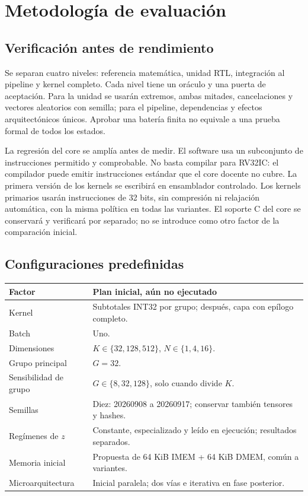 \section{Metodología de evaluación}
\subsection{Verificación antes de rendimiento}
Se separan cuatro niveles: referencia matemática, unidad RTL, integración
al pipeline y kernel completo. Cada nivel tiene un oráculo y una puerta de
aceptación. Para la unidad se usarán extremos, ambas mitades, cancelaciones
y vectores aleatorios con semilla; para el pipeline, dependencias y efectos
arquitectónicos únicos. Aprobar una batería finita no equivale a una prueba
formal de todos los estados.

La regresión del core se amplía antes de medir. El software usa un subconjunto
de instrucciones permitido y comprobable. No basta compilar para RV32IC: el
compilador puede emitir instrucciones estándar que el core docente no cubre.
La primera versión de los kernels se escribirá en ensamblador controlado.
Los kernels primarios usarán instrucciones de 32 bits, sin compresión ni
relajación automática, con la misma política en todas las variantes. El
soporte C del core se conservará y verificará por separado; no se introduce
como otro factor de la comparación inicial.

\subsection{Configuraciones predefinidas}
\begin{tabularx}{\textwidth}{@{}lY@{}}
\toprule
\textbf{Factor} & \textbf{Plan inicial, aún no ejecutado}\\\midrule
Kernel & Subtotales INT32 por grupo; después, capa con epílogo completo.\\
Batch & Uno.\\
Dimensiones & \(K\in\{32,128,512\}\), \(N\in\{1,4,16\}\).\\
Grupo principal & \(G=32\).\\
Sensibilidad de grupo & \(G\in\{8,32,128\}\), solo cuando divide \(K\).\\
Semillas & Diez: 20260908 a 20260917; conservar también tensores y hashes.\\
Regímenes de \(z\) & Constante, especializado y leído en ejecución; resultados separados.\\
Memoria inicial & Propuesta de 64 KiB IMEM + 64 KiB DMEM, común a variantes.\\
Microarquitectura & Inicial paralela; dos vías e iterativa en fase posterior.\\\bottomrule
\end{tabularx}\par

